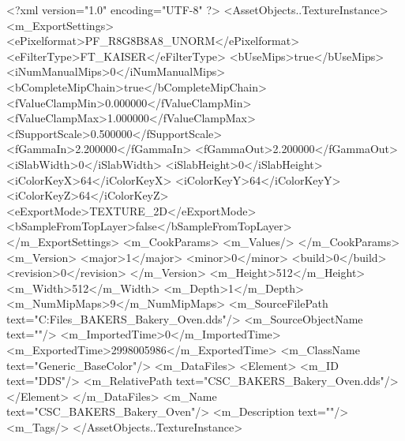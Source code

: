 <?xml version="1.0" encoding="UTF-8" ?>
<AssetObjects..TextureInstance>
	<m_ExportSettings>
		<ePixelformat>PF_R8G8B8A8_UNORM</ePixelformat>
		<eFilterType>FT_KAISER</eFilterType>
		<bUseMips>true</bUseMips>
		<iNumManualMips>0</iNumManualMips>
		<bCompleteMipChain>true</bCompleteMipChain>
		<fValueClampMin>0.000000</fValueClampMin>
		<fValueClampMax>1.000000</fValueClampMax>
		<fSupportScale>0.500000</fSupportScale>
		<fGammaIn>2.200000</fGammaIn>
		<fGammaOut>2.200000</fGammaOut>
		<iSlabWidth>0</iSlabWidth>
		<iSlabHeight>0</iSlabHeight>
		<iColorKeyX>64</iColorKeyX>
		<iColorKeyY>64</iColorKeyY>
		<iColorKeyZ>64</iColorKeyZ>
		<eExportMode>TEXTURE_2D</eExportMode>
		<bSampleFromTopLayer>false</bSampleFromTopLayer>
	</m_ExportSettings>
	<m_CookParams>
		<m_Values/>
	</m_CookParams>
	<m_Version>
		<major>1</major>
		<minor>0</minor>
		<build>0</build>
		<revision>0</revision>
	</m_Version>
	<m_Height>512</m_Height>
	<m_Width>512</m_Width>
	<m_Depth>1</m_Depth>
	<m_NumMipMaps>9</m_NumMipMaps>
	<m_SourceFilePath text="C:\Users\Shadow\Desktop\Working Files\Textures\CSC_BAKERS_Bakery_Oven.dds"/>
	<m_SourceObjectName text=""/>
	<m_ImportedTime>0</m_ImportedTime>
	<m_ExportedTime>2998005986</m_ExportedTime>
	<m_ClassName text="Generic_BaseColor"/>
	<m_DataFiles>
		<Element>
			<m_ID text="DDS"/>
			<m_RelativePath text="CSC_BAKERS_Bakery_Oven.dds"/>
		</Element>
	</m_DataFiles>
	<m_Name text="CSC_BAKERS_Bakery_Oven"/>
	<m_Description text=""/>
	<m_Tags/>
</AssetObjects..TextureInstance>

